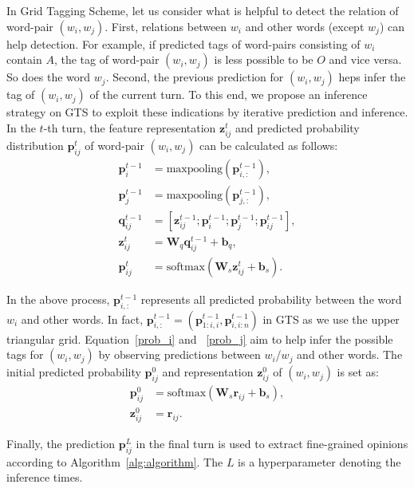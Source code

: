 \documentclass[11pt,a4paper]{article}
\begin{document}
In Grid Tagging Scheme, let us consider what is helpful to detect the relation of word-pair $(w_i, w_j)$. First, relations between $w_i$ and other words (except $w_j$) can help detection. For example, if predicted tags of word-pairs consisting of $w_i$ contain $A$, the tag of word-pair $(w_i, w_j)$ is less possible to be $O$ and vice versa. So does the word $w_j$. Second, the previous prediction for $(w_i, w_j)$ heps infer the tag of $(w_i, w_j)$ of the current turn. To this end, we propose an inference strategy on GTS to exploit these indications by iterative prediction and inference. In the $t$-th turn, the feature representation $\mathbf{z}_{ij}^t$ and predicted probability distribution $\mathbf{p}_{ij}^t$ of word-pair $(w_i, w_j)$ can be calculated as follows:
\begin{align}
	\mathbf{p}_{i}^{t-1} &= \text{maxpooling}(\mathbf{p}_{i,:}^{t-1}), \label{prob_i}\\
	\mathbf{p}_{j}^{t-1} &= \text{maxpooling}(\mathbf{p}_{j,:}^{t-1}), \label{prob_j}\\
	\mathbf{q}_{ij}^{t-1} &= [\mathbf{z}_{ij}^{t-1}; \mathbf{p}_{i}^{t-1}; \mathbf{p}_{j}^{t-1}; \mathbf{p}_{ij}^{t-1}], \\
	\mathbf{z}_{ij}^t &= \mathbf{W}_{q}\mathbf{q}_{ij}^{t-1} +\mathbf{b}_{q}, \\
	\mathbf{p}_{ij}^t &= \text{softmax}(\mathbf{W}_{s}\mathbf{z}_{ij}^t +\mathbf{b}_{s}).
\end{align}

In the above process, $\mathbf{p}_{i,:}^{t-1}$ represents all predicted probability between the word $w_i$ and other words. In fact, $\mathbf{p}_{i,:}^{t-1} = (\mathbf{p}_{1:i,i}^{t-1}, \mathbf{p}_{i,i:n}^{t-1})$ in GTS as we use the upper triangular grid. Equation~\ref{prob_i} and ~\ref{prob_j} aim to help infer the possible tags for $(w_i, w_j)$ by observing predictions between $w_i$/$w_j$ and other words. The initial predicted probability $\mathbf{p}_{ij}^0$ and representation $\mathbf{z}_{ij}^0$ of $(w_i, w_j)$ is set as:
\begin{align}
	\mathbf{p}_{ij}^0 &= \text{softmax}(\mathbf{W}_{s}\mathbf{r}_{ij} +\mathbf{b}_{s}), \\
	\mathbf{z}_{ij}^0 &= \mathbf{r}_{ij}.
\end{align}

Finally, the prediction $\mathbf{p}_{ij}^L$ in the final turn is used to extract fine-grained opinions according to Algorithm~\ref{alg:algorithm}. The $L$ is a hyperparameter denoting the inference times.
\end{document}
